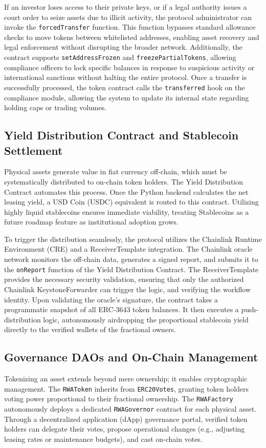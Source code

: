 \documentclass[12pt, a4paper]{article}
\begin{document}
If an investor loses access to their private keys, or if a legal authority issues a court order to seize assets due to illicit activity, the protocol administrator can invoke the \texttt{forcedTransfer} function. This function bypasses standard allowance checks to move tokens between whitelisted addresses, enabling asset recovery and legal enforcement without disrupting the broader network. Additionally, the contract supports \texttt{setAddressFrozen} and \texttt{freezePartialTokens}, allowing compliance officers to lock specific balances in response to suspicious activity or international sanctions without halting the entire protocol. Once a transfer is successfully processed, the token contract calls the \texttt{transferred} hook on the compliance module, allowing the system to update its internal state regarding holding caps or trading volumes.

\subsection{Yield Distribution Contract and Stablecoin Settlement}
Physical assets generate value in fiat currency off-chain, which must be systematically distributed to on-chain token holders. The Yield Distribution Contract automates this process. Once the Python backend calculates the net leasing yield, a USD Coin (USDC) equivalent is routed to this contract. Utilizing highly liquid stablecoins ensures immediate viability, treating Stablecoins as a future roadmap feature as institutional adoption grows.

To trigger the distribution seamlessly, the protocol utilizes the Chainlink Runtime Environment (CRE) and a ReceiverTemplate integration. The Chainlink oracle network monitors the off-chain data, generates a signed report, and submits it to the \texttt{onReport} function of the Yield Distribution Contract. The ReceiverTemplate provides the necessary security validation, ensuring that only the authorized Chainlink KeystoneForwarder can trigger the logic, and verifying the workflow identity. Upon validating the oracle's signature, the contract takes a programmatic snapshot of all ERC-3643 token balances. It then executes a push-distribution logic, autonomously airdropping the proportional stablecoin yield directly to the verified wallets of the fractional owners.

\subsection{Governance DAOs and On-Chain Management}
Tokenizing an asset extends beyond mere ownership; it enables cryptographic management. The \texttt{RWAToken} inherits from \texttt{ERC20Votes}, granting token holders voting power proportional to their fractional ownership. The \texttt{RWAFactory} autonomously deploys a dedicated \texttt{RWAGovernor} contract for each physical asset. Through a decentralized application (dApp) governance portal, verified token holders can delegate their votes, propose operational changes (e.g., adjusting leasing rates or maintenance budgets), and cast on-chain votes. 
\end{document}
